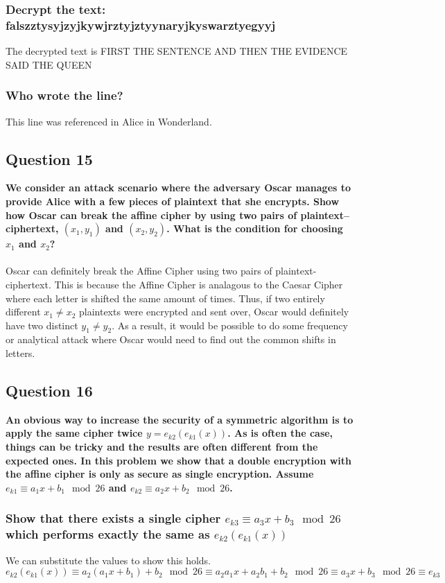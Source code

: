 \documentclass[titlepage]{article}
\begin{document}
{{\subsubsection{Decrypt the text: falszztysyjzyjkywjrztyjztyynaryjkyswarztyegyyj}
{
The decrypted text is FIRST THE SENTENCE AND THEN THE EVIDENCE SAID THE QUEEN
}
\subsubsection{Who wrote the line?}
{
This line was referenced in Alice in Wonderland.
}
}
\clearpage
\subsection{Question 15}
{
\textbf{We consider an attack scenario where the adversary Oscar manages to provide Alice with a few pieces of plaintext that she encrypts. Show how Oscar can break the affine cipher by using two pairs of plaintext–ciphertext, \((x_1,y_1)\) and \((x_2,y_2)\). What is the condition for choosing \(x_1\) and \(x_2\)?}\\\\
Oscar can definitely break the Affine Cipher using two pairs of plaintext-ciphertext. This is because the Affine Cipher is analagous to the Caesar Cipher where each letter is shifted the same amount of times. Thus, if two entirely different \(x_1 \neq x_2\) plaintexts were encrypted and sent over, Oscar would definitely have two distinct \(y_1 \neq y_2\). As a result, it would be possible to do some frequency or analytical attack where Oscar would need to find out the common shifts in letters.
}
\subsection{Question 16}
{
\textbf{An obvious way to increase the security of a symmetric algorithm is to apply the same cipher twice \(y = e_{k2}(e_{k1}(x))\). As is often the case, things can be tricky and the results are often different from the expected ones. In this problem we show that a double encryption with the affine cipher is only as secure as single encryption. Assume \(e_{k1} \equiv a_1x + b_1 \mod 26\) and \(e_{k2} \equiv a_2x + b_2 \mod 26\).}
\subsubsection{Show that there exists a single cipher \(e_{k3} \equiv a_3x + b_3 \mod 26\) which performs exactly the same as \(e_{k2}(e_{k1}(x))\)}
{
We can substitute the values to show this holds. \(e_{k2}(e_{k1}(x)) \equiv a_2(a_1x + b_1) + b_2 \mod 26 \equiv a_2a_1x + a_2b_1 + b_2 \mod 26 \equiv a_3x + b_3 \mod 26 \equiv e_{k3}\)
}
}}
\end{document}
